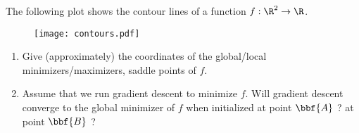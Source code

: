 \documentclass[11pt,nocut]{article}
\begin{document}



\begin{problem}[2 points] The following plot shows the contour lines of a function $f:\R^2 \to \R$.
	\begin{figure}[H]
		\begin{center}
		\texttt{[image: contours.pdf]}
		\end{center}
	\end{figure}
	\begin{enumerate}[label=\normalfont(\textbf{\alph*})]
		\item Give (approximately) the coordinates of the global/local minimizers/maximizers, saddle points of $f$.
		\item Assume that we run gradient descent to minimize $f$. Will gradient descent converge to the global minimizer of $f$ when initialized at point $\bbf{A}$ ? at point $\bbf{B}$ ?
	\end{enumerate}
\end{problem}

\vspace{5mm}
\end{document}
